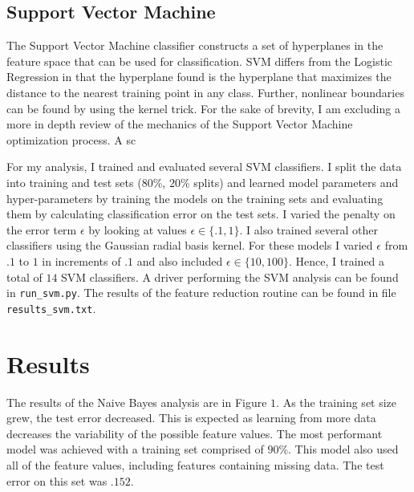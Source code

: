\documentclass[11pt, oneside]{article}   	%
\begin{document}
\subsection{Support Vector Machine}

The Support Vector Machine classifier constructs a set of hyperplanes in the feature space that can be used for classification. SVM differs from the Logistic Regression in that the hyperplane found is the hyperplane that maximizes the distance to the nearest training point in any class. Further, nonlinear boundaries can be found by using the kernel trick. For the sake of brevity, I am excluding a more in depth review of the mechanics of the Support Vector Machine optimization process. A sc

For my analysis, I trained and evaluated several SVM classifiers. I split the data into training and test sets ($80$\%, $20$\% splits) and learned model parameters and hyper-parameters by training the models on the training sets and evaluating them by calculating classification error on the test sets.  I varied the penalty on the error term $ \epsilon $ by looking at values  $ \epsilon \in \{ .1,1 \}  $. I also trained several other classifiers using the Gaussian radial basis kernel. For these models I varied $ \epsilon $ from $.1$ to $1$ in increments of $.1$ and also included $\epsilon \in \{ 10, 100 \}$. Hence, I trained a total of $14$ SVM classifiers. A driver performing the SVM analysis can be found in \texttt{run\_svm.py}. The results of the feature reduction routine can be found in file \texttt{results\_svm.txt}.
 
\section{Results}
 
The results of the Naive Bayes analysis are in Figure $1$. As the training set size grew, the test error decreased. This is expected as learning from more data decreases the variability of the possible feature values. The most performant model was achieved with a training set comprised of $90$\%. This model also used all of the feature values, including features containing missing data. The test error on this set was $.152$. 
\end{document}
